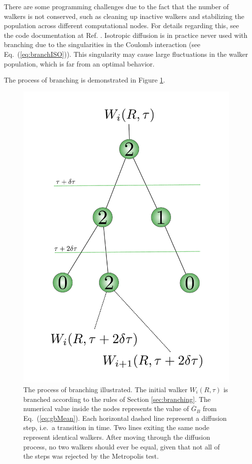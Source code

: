 There are some programming challenges due to the fact that the number of walkers is not conserved, such as cleaning up inactive walkers and stabilizing the population across different computational nodes. For details regarding this, see the code documentation at Ref. \cite{libBorealisCode}. Isotropic diffusion is in practice never used with branching due to the singularities in the Coulomb interaction (see Eq.~(\ref{eq:branchISO})). This singularity may cause large fluctuations in the walker population, which is far from an optimal behavior.

The process of branching is demonstrated in Figure \ref{fig:branching}.

\begin{figure}
 \begin{center}
  \includegraphics[scale=0.5]{../Graphics/branching.pdf}
  \caption{The process of branching illustrated. The initial walker $W_i(R, \tau)$ is branched according to the rules of Section \ref{sec:branching}. The numerical value inside the nodes represents the value of $\overline{G}_B$ from Eq.~(\ref{eq:gbMean}). Each horizontal dashed line represent a diffusion step, i.e.~a transition in time. Two lines exiting the same node represent identical walkers. After moving through the diffusion process, no two walkers should ever be equal, given that not all of the steps was rejected by the Metropolis test.}
  \label{fig:branching}
 \end{center}
\end{figure}
\clearpage

